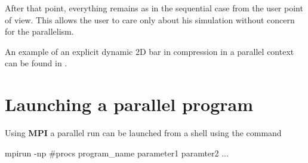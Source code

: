 After that point, everything remains as in the sequential case from
the user point of view. This allows the user to care only
about his simulation without concern for the parallelism.

An example of an explicit dynamic 2D bar in compression in a parallel
context can be found in .

\section{Launching a parallel program}

Using \textbf{MPI} a parallel run can be launched from a shell
using the command

\begin{cpp}
  mpirun -np #procs program_name parameter1 paramter2 ...
\end{cpp}

